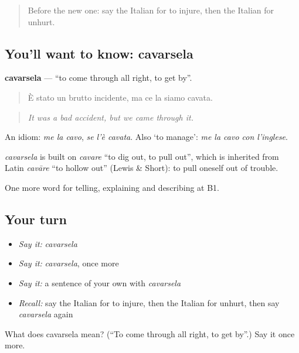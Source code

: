 \label{lesson:IT-C300-cavarsela}



\begin{quote}
Before the new one: say the Italian for to injure, then the Italian for unhurt.
\end{quote}

\subsection*{You'll want to know: cavarsela}
\textbf{cavarsela} — \textquotedblleft{}to come through all right, to get by\textquotedblright{}.

\begin{quote}
È stato un brutto incidente, ma ce la siamo cavata.
\end{quote}

\begin{quote}
\emph{It was a bad accident, but we came through it.}
\end{quote}

An idiom: \emph{me la cavo}, \emph{se l'è cavata}. Also ‘to manage’: \emph{me la cavo con l'inglese}.

\begin{cousinweb}
\emph{cavarsela} is built on \emph{cavare} \textquotedblleft{}to dig out, to pull out\textquotedblright{}, which is inherited from Latin \emph{cavāre} \textquotedblleft{}to hollow out\textquotedblright{} (Lewis \& Short): to pull oneself out of trouble.
\end{cousinweb}

\begin{grammarlens}[title={What you've built}]
One more word for telling, explaining and describing at B1.
\end{grammarlens}

\subsection*{Your turn}
\begin{itemize}
\raggedright
  \item \emph{Say it:} \emph{cavarsela}
  \item \emph{Say it:} \emph{cavarsela}, once more
  \item \emph{Say it:} a sentence of your own with \emph{cavarsela}
  \item \emph{Recall:} say the Italian for to injure, then the Italian for unhurt, then say \emph{cavarsela} again
\end{itemize}

\begin{tcolorbox}[breakable,colback=teal!4,colframe=teal!35!black,title={Before you move on}]
What does cavarsela mean? (\textquotedblleft{}To come through all right, to get by\textquotedblright{}.) Say it once more.
\end{tcolorbox}
